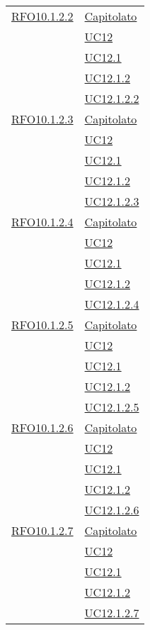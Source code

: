 \begin{longtable}{|>{\centering}m{5cm}|m{5cm}<{\centering}|}
 \hyperlink{RFO10.1.2.2}{RFO10.1.2.2} & \hyperlink{Capitolato}{Capitolato}\\
& \hyperref[UC12]{UC12}\\
& \hyperref[UC12.1]{UC12.1}\\
& \hyperref[UC12.1.2]{UC12.1.2}\\
& \hyperref[UC12.1.2.2]{UC12.1.2.2}\\\hline

 \hyperlink{RFO10.1.2.3}{RFO10.1.2.3} & \hyperlink{Capitolato}{Capitolato}\\
& \hyperref[UC12]{UC12}\\
& \hyperref[UC12.1]{UC12.1}\\
& \hyperref[UC12.1.2]{UC12.1.2}\\
& \hyperref[UC12.1.2.3]{UC12.1.2.3}\\\hline

 \hyperlink{RFO10.1.2.4}{RFO10.1.2.4} & \hyperlink{Capitolato}{Capitolato}\\
& \hyperref[UC12]{UC12}\\
& \hyperref[UC12.1]{UC12.1}\\
& \hyperref[UC12.1.2]{UC12.1.2}\\
& \hyperref[UC12.1.2.4]{UC12.1.2.4}\\\hline

 \hyperlink{RFO10.1.2.5}{RFO10.1.2.5} & \hyperlink{Capitolato}{Capitolato}\\
& \hyperref[UC12]{UC12}\\
& \hyperref[UC12.1]{UC12.1}\\
& \hyperref[UC12.1.2]{UC12.1.2}\\
& \hyperref[UC12.1.2.5]{UC12.1.2.5}\\\hline

 \hyperlink{RFO10.1.2.6}{RFO10.1.2.6} & \hyperlink{Capitolato}{Capitolato}\\
& \hyperref[UC12]{UC12}\\
& \hyperref[UC12.1]{UC12.1}\\
& \hyperref[UC12.1.2]{UC12.1.2}\\
& \hyperref[UC12.1.2.6]{UC12.1.2.6}\\\hline

 \hyperlink{RFO10.1.2.7}{RFO10.1.2.7} & \hyperlink{Capitolato}{Capitolato}\\
& \hyperref[UC12]{UC12}\\
& \hyperref[UC12.1]{UC12.1}\\
& \hyperref[UC12.1.2]{UC12.1.2}\\
& \hyperref[UC12.1.2.7]{UC12.1.2.7}\\\hline


\end{longtable}
